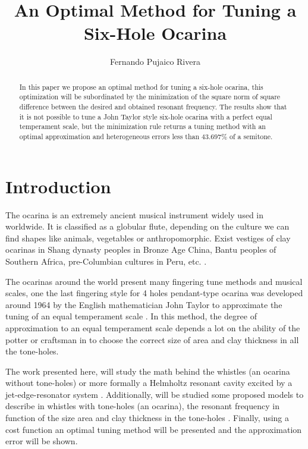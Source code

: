 \documentclass[11pt,twocolumn]{article}
\title{An Optimal Method for Tuning a Six-Hole Ocarina }
\author{Fernando Pujaico Rivera}
\date{ }
\begin{document}
\maketitle


\begin{abstract}
In this paper we propose an optimal method for tuning a six-hole ocarina,
this optimization will be subordinated by the minimization of 
the square norm of square difference between the desired and obtained resonant frequency.
The results show that it is not possible to tune a John Taylor style six-hole ocarina with a perfect equal temperament scale, 
but the minimization rule returns a tuning method with an optimal approximation and heterogeneous errors less than $43.697\%$ of a semitone.
\end{abstract}



\section{Introduction}
The ocarina is an extremely ancient musical instrument widely used in worldwide. 
It is classified as a globular flute,
depending on the culture we can find shapes like animals, vegetables or anthropomorphic.
Exist vestiges of clay ocarinas in 
Shang dynasty peoples in Bronze Age China, 
Bantu peoples of Southern Africa,
pre-Columbian cultures in Peru, etc.
\cite[pp. 589]{apel1969harvard} \cite[pp. 166-168]{sachs2012history} \cite[pp. 31]{leinweber2020art} \cite{rossi2020recuperacion}.

The ocarinas around the world present many fingering tune methods and musical scales,
one the last fingering style for 4 holes pendant-type ocarina was developed around 1964 
by the English mathematician John Taylor 
to approximate the tuning of an equal temperament scale 
\cite[pp. 79]{metropolitan1985american} \cite[pp. 10]{galpin2001newsletter}.
In this method, 
the degree of approximation to an equal temperament scale depends a lot on the ability of the potter or craftsman
in to choose the correct size of area and clay thickness in all the tone-holes.

The work presented here, will study the math behind the whistles (an ocarina without tone-holes)  
or more formally a Helmholtz resonant cavity \cite{corning2011resonance} excited by a jet-edge-resonator system \cite[pp. 3]{gibiat2013acoustic} \cite[pp. 138]{nyborg1953characteristics}. 
Additionally, will be studied some proposed models to describe in whistles with tone-holes (an ocarina),
the resonant frequency in function of the size area and  clay thickness in the tone-holes 
\cite{mp2010ocarina} \cite[pp. 44]{cabreraestudio} \cite{1999air}.
Finally, using a cost function an optimal tuning method will be presented 
and the approximation error will be shown. 
\end{document}
